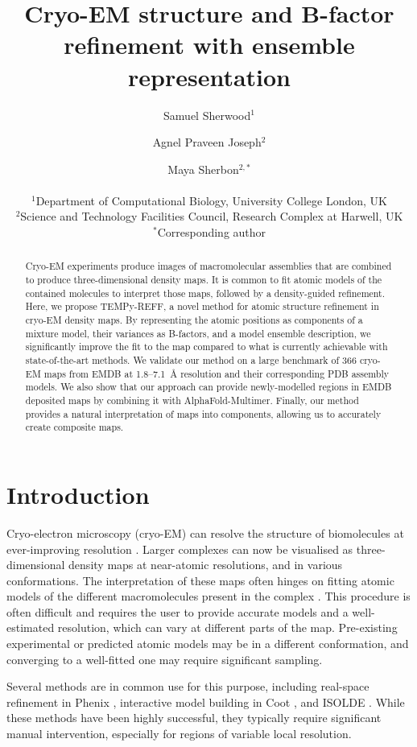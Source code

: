 \documentclass[11pt]{article}
\title{Cryo-EM structure and B-factor refinement with ensemble representation}
\author{
Samuel Sherwood$^{1}$ \and Agnel Praveen Joseph$^{2}$ \and Maya Sherbon$^{2,*}$\\
\\
\small $^{1}$Department of Computational Biology, University College London, UK\\
\small $^{2}$Science and Technology Facilities Council, Research Complex at Harwell, UK\\
\small $^{*}$Corresponding author
}
\date{}
\begin{document}
\maketitle

\begin{abstract}
Cryo-EM experiments produce images of macromolecular assemblies that are combined to produce three-dimensional density maps. It is common to fit atomic models of the contained molecules to interpret those maps, followed by a density-guided refinement. Here, we propose TEMPy-REFF, a novel method for atomic structure refinement in cryo-EM density maps. By representing the atomic positions as components of a mixture model, their variances as B-factors, and a model ensemble description, we significantly improve the fit to the map compared to what is currently achievable with state-of-the-art methods. We validate our method on a large benchmark of 366 cryo-EM maps from EMDB at 1.8--7.1~\AA{} resolution and their corresponding PDB assembly models. We also show that our approach can provide newly-modelled regions in EMDB deposited maps by combining it with AlphaFold-Multimer. Finally, our method provides a natural interpretation of maps into components, allowing us to accurately create composite maps.
\end{abstract}

\section{Introduction}

Cryo-electron microscopy (cryo-EM) can resolve the structure of biomolecules at ever-improving resolution \citep{burnley2017}. Larger complexes can now be visualised as three-dimensional density maps at near-atomic resolutions, and in various conformations. The interpretation of these maps often hinges on fitting atomic models of the different macromolecules present in the complex \citep{joseph2017,farabella2015,hoh2020}. This procedure is often difficult and requires the user to provide accurate models and a well-estimated resolution, which can vary at different parts of the map. Pre-existing experimental or predicted atomic models may be in a different conformation, and converging to a well-fitted one may require significant sampling.

Several methods are in common use for this purpose, including real-space refinement in Phenix \citep{afonine2018}, interactive model building in Coot \citep{emsley2010}, and ISOLDE \citep{croll2018}. While these methods have been highly successful, they typically require significant manual intervention, especially for regions of variable local resolution.
\end{document}
